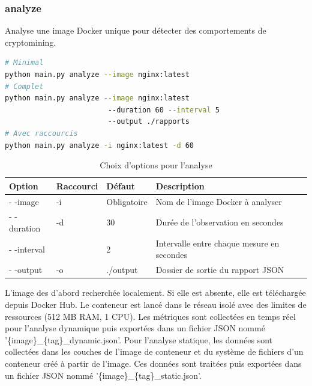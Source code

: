 \subsubsection{analyze}
Analyse une image Docker unique pour détecter des comportements de cryptomining. \\
\begin{lstlisting}[language=bash, caption=commande analyze]
# Minimal 
python main.py analyze --image nginx:latest 
# Complet 
python main.py analyze --image nginx:latest 
                        --duration 60 --interval 5
                        --output ./rapports 
# Avec raccourcis 
python main.py analyze -i nginx:latest -d 60
\end{lstlisting}
\begin{table}[H]
    \centering
    \begin{tabularx}{\textwidth}{|l|l|l|X|}
        \hline
        \textbf{Option} & \textbf{Raccourci} & \textbf{Défaut} & \textbf{Description} \\
        \hline
        - -image & -i & Obligatoire & Nom de l'image Docker à analyser \\
        \hline
        - -duration & -d & 30 & Durée de l'observation en secondes \\
        \hline
        - -interval &  & 2 & Intervalle entre chaque mesure en secondes \\
        \hline
        - -output & -o & ./output & Dossier de sortie du rapport JSON \\
        \hline
    \end{tabularx}
    \caption{Choix d'options pour l'analyse}
\end{table}
L'image des d'abord recherchée localement. Si elle est absente, elle est téléchargée depuis Docker Hub. Le conteneur est lancé dans le réseau isolé avec des limites de ressources (512 MB RAM, 1 CPU). Les métriques sont collectées en temps réel pour l'analyse dynamique puis exportées dans un fichier JSON nommé '\{image\}\_\{tag\}\_dynamic.json'. Pour l'analyse statique, les données sont collectées dans les couches de l'image de conteneur et du système de fichiers d'un conteneur créé à partir de l'image. Ces données sont traitées puis exportées dans un fichier JSON nommé '\{image\}\_\{tag\}\_static.json'. \\
